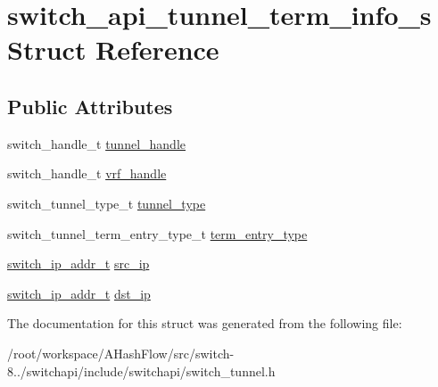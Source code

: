 \hypertarget{structswitch__api__tunnel__term__info__s}{\section{switch\+\_\+api\+\_\+tunnel\+\_\+term\+\_\+info\+\_\+s Struct Reference}
\label{structswitch__api__tunnel__term__info__s}
}
\subsection*{Public Attributes}
\begin{DoxyCompactItemize}
\item 
switch\+\_\+handle\+\_\+t \hyperlink{group__Tunnel_ga8741eaf6ce1e5362f4fe1a61fbb1b3a5}{tunnel\+\_\+handle}
\item 
switch\+\_\+handle\+\_\+t \hyperlink{group__Tunnel_gad17881c029ef16dde1b3fdc6d66ad388}{vrf\+\_\+handle}
\item 
switch\+\_\+tunnel\+\_\+type\+\_\+t \hyperlink{group__Tunnel_gaa35e1acc0835967b9202df9383e8a060}{tunnel\+\_\+type}
\item 
switch\+\_\+tunnel\+\_\+term\+\_\+entry\+\_\+type\+\_\+t \hyperlink{group__Tunnel_ga3d6d200a504a59a4075506ccc5afaebe}{term\+\_\+entry\+\_\+type}
\item 
\hyperlink{structswitch__ip__addr__s}{switch\+\_\+ip\+\_\+addr\+\_\+t} \hyperlink{group__Tunnel_gae3eaebd60a50c2437066dace61929bd5}{src\+\_\+ip}
\item 
\hyperlink{structswitch__ip__addr__s}{switch\+\_\+ip\+\_\+addr\+\_\+t} \hyperlink{group__Tunnel_ga82dc368b7c3f3663420f3c1b41a04880}{dst\+\_\+ip}
\end{DoxyCompactItemize}


The documentation for this struct was generated from the following file\+:\begin{DoxyCompactItemize}
\item 
/root/workspace/\+A\+Hash\+Flow/src/switch-\/8../switchapi/include/switchapi/switch\+\_\+tunnel.\+h\end{DoxyCompactItemize}
